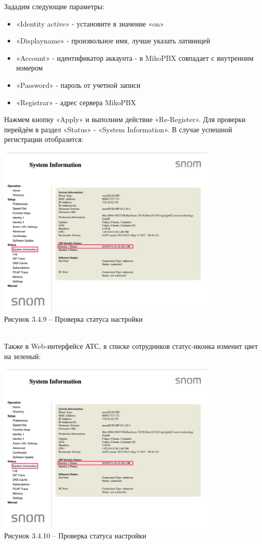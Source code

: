     Зададим следующие параметры:
    \begin{itemize}
        \item «Identity active» - установите в значение «on»
        \item «Displayname» - произвольное имя, лучше указать латиницей
        \item «Account» - идентификатор аккаунта - в MikoPBX совпадает с внутренним номером
        \item «Password» - пароль от учетной записи
        \item «Registrar» - адрес сервера MikoPBX
    \end{itemize}

    Нажмем кнопку «Apply» и выполним действие «Re-Register».
    Для проверки перейдём в раздел «Status» - «System Information».
    В случае успешной регистрации отобразится:
    \\
    \begin{center}
        \includegraphics[width=0.8\textwidth]{images/check}\\
        Рисунок 3.4.9 – Проверка статуса настройки
    \end{center}
    \\

Также в Web-интерфейсе АТС, в списке сотрудников статус-иконка изменит цвет на зеленый:
    \\
    \begin{center}
        \includegraphics[width=0.8\textwidth]{images/check}\\
        Рисунок 3.4.10 – Проверка статуса настройки
    \end{center}
    \\

